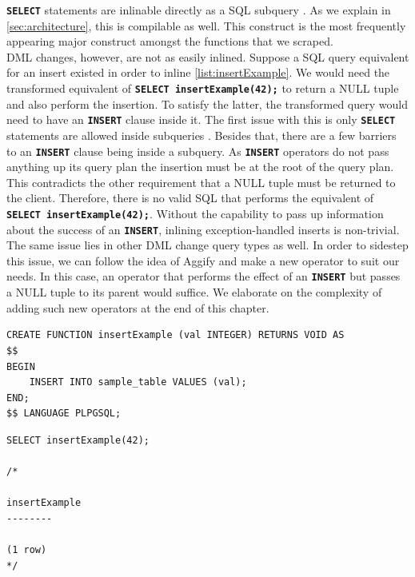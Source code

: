 \documentclass[12pt]{cmuthesis}
\newcommand{\dbSQL}[1]{\texttt{\textbf{#1}}\xspace}
\begin{document}
\dbSQL{SELECT} statements are inlinable directly as a SQL subquery \cite{ramachandra19}. As we explain in \cref{sec:architecture}, this is compilable as well. This construct is the most frequently appearing major construct amongst the functions that we scraped.\\

DML changes, however, are not as easily inlined. Suppose a SQL query equivalent for an insert existed in order to inline \cref{list:insertExample}. We would need the transformed equivalent of \dbSQL{SELECT insertExample(42);} to return a NULL tuple and also perform the insertion. To satisfy the latter, the transformed query would need to have an \dbSQL{INSERT} clause inside it. The first issue with this is only \dbSQL{SELECT} statements are allowed inside subqueries \cite{assaf_2018, w3resource_2020}. Besides that, there are a few barriers to an \dbSQL{INSERT} clause being inside a subquery. As \dbSQL{INSERT} operators do not pass anything up its query plan the insertion must be at the root of the query plan. This contradicts the other requirement that a NULL tuple must be returned to the client. Therefore, there is no valid SQL that performs the equivalent of \dbSQL{SELECT insertExample(42);}. Without the capability to pass up information about the success of an \dbSQL{INSERT}, inlining exception-handled inserts is non-trivial. The same issue lies in other DML change query types as well. In order to sidestep this issue, we can follow the idea of Aggify and make a new operator to suit our needs. In this case, an operator that performs the effect of an \dbSQL{INSERT} but passes a NULL tuple to its parent would suffice. We elaborate on the complexity of adding such new operators at the end of this chapter.

\begin{listing}
    \begin{verbatim}
CREATE FUNCTION insertExample (val INTEGER) RETURNS VOID AS 
$$
BEGIN
    INSERT INTO sample_table VALUES (val);
END;
$$ LANGUAGE PLPGSQL;

\end{verbatim}
\caption{Example of PL/PGSQL UDF that inserts into sample\_table the parameter value, \texttt{val}.}
\label{list:insertExample}
\end{listing}


\begin{listing}
    \begin{verbatim}
SELECT insertExample(42);

/* 

insertExample 
--------

(1 row)
*/
\end{verbatim}
\caption{Invocation and output of \texttt{insertExample} from \cref{list:insertexample}. It runs succesfully and returns NULL to the client.}
\label{list:insertExampleInvocation}
\end{listing}
\end{document}
